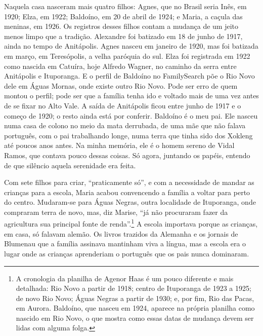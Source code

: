 \documentclass[
  brazilian,
  11pt,
  openany]{book}
\begin{document}
Naquela casa nasceram mais quatro filhos: Agnes, que no Brasil seria
Inês, em 1920; Elza, em 1922; Baldoíno, em 20 de abril de 1924; e Maria,
a caçula das meninas, em 1926. Os registros desses filhos contam a
mudança de um jeito menos limpo que a tradição. Alexandre foi batizado
em 18 de junho de 1917, ainda no tempo de Anitápolis. Agnes nasceu em
janeiro de 1920, mas foi batizada em março, em Teresópolis, a velha
paróquia do sul. Elza foi registrada em 1922 como nascida em Catuíra,
hoje Alfredo Wagner, no caminho da serra entre Anitápolis e Ituporanga.
E o perfil de Baldoíno no FamilySearch põe o Rio Novo dele em Águas
Mornas, onde existe outro Rio Novo. Pode ser erro de quem montou o
perfil; pode ser que a família tenha ido e voltado mais de uma vez antes
de se fixar no Alto Vale. A saída de Anitápolis ficou entre junho de
1917 e o começo de 1920; o resto ainda está por conferir. Baldoíno é o
meu pai. Ele nasceu numa casa de colono no meio da mata derrubada, de
uma mãe que não falava português, com o pai trabalhando longe, numa
terra que tinha sido dos Xokleng até poucos anos antes. Na minha
memória, ele é o homem sereno de Vidal Ramos, que contava pouco dessas
coisas. Só agora, juntando os papéis, entendo de que silêncio aquela
serenidade era feita.

Com sete filhos para criar, ``praticamente só'', e com a necessidade de
mandar as crianças para a escola, Maria acabou convencendo a família a
voltar para perto do centro. Mudaram-se para Águas Negras, outra
localidade de Ituporanga, onde compraram terra de novo, mas, diz Marise,
``já não procuraram fazer da agricultura sua principal fonte de
renda''.\footnote{A cronologia da planilha de Agenor Haas é um pouco
  diferente e mais detalhada: Rio Novo a partir de 1918; centro de
  Ituporanga de 1923 a 1925; de novo Rio Novo; Águas Negras a partir de
  1930; e, por fim, Rio das Pacas, em Aurora. Baldoíno, que nasceu em
  1924, aparece na própria planilha como nascido em Rio Novo, o que
  mostra como essas datas de mudança devem ser lidas com alguma folga.}
A escola importava porque as crianças, em casa, só falavam alemão. Os
livros trazidos da Alemanha e os jornais de Blumenau que a família
assinava mantinham viva a língua, mas a escola era o lugar onde as
crianças aprenderiam o português que os pais nunca dominaram.
\end{document}
